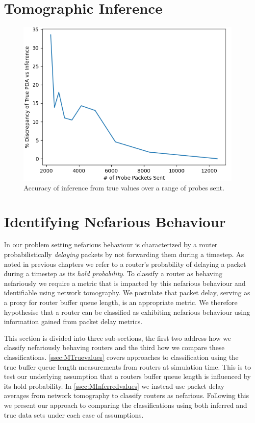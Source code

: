 \section{Tomographic Inference}
\begin{figure}[H]
        \centering
        \includegraphics[width=\textwidth]{figs/results/Probe_PDV_accuracy_plot.png}
        \caption{Accuracy of inference from true values over a range of probes sent.}
        \label{fig:Rqstabilization}
\end{figure}



\section{Identifying Nefarious Behaviour}
\label{sec:MNefidentification}
  In our problem setting nefarious behaviour is characterized by a router probabilistically \textit{delaying} packets by not forwarding them during a timestep. As noted in previous chapters we refer to a router's probability of delaying a packet during a timestep as its \textit{hold probability}. To classify a router as behaving nefariously we require a metric that is impacted by this nefarious behaviour and identifiable using network tomography. We postulate that packet delay, serving as a proxy for router buffer queue length, is an appropriate metric. We therefore hypothesise that a router can be classified as exhibiting nefarious behaviour using information gained from packet delay metrics.\par
  This section is divided into three sub-sections, the first two address how we classify nefariously behaving routers and the third how we compare these classifications. \cref{ssec:MTruevalues} covers approaches to classification using the true buffer queue length measurements from routers at simulation time. This is to test our underlying assumption that a routers buffer queue length is influenced by its hold probability. In \cref{ssec:MInferredvalues} we instead use packet delay averages from network tomography to classify routers as nefarious. Following this we present our approach to comparing the classifications using both inferred and true data sets under each case of assumptions.
  

